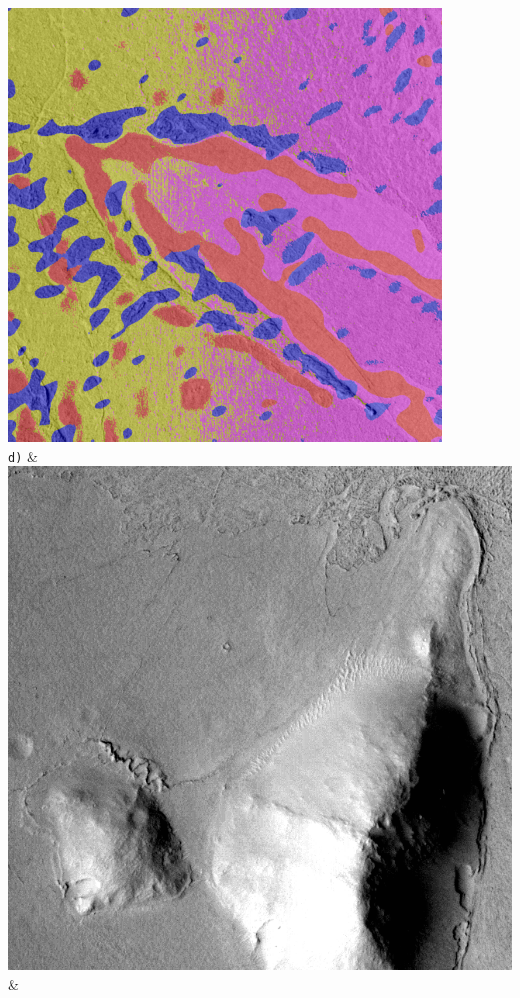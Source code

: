 \begin{table}[h!]
\begin{tabularx}{\textwidth}
		\includegraphics[width=0.9\linewidth]{images/gen/filter_size/p03_03.png_1.50.png} \\
		\texttt{d)} &
		\includegraphics[width=0.9\linewidth]{images/p03/p03_04.png} &

\end{tabularx}
\end{table}
